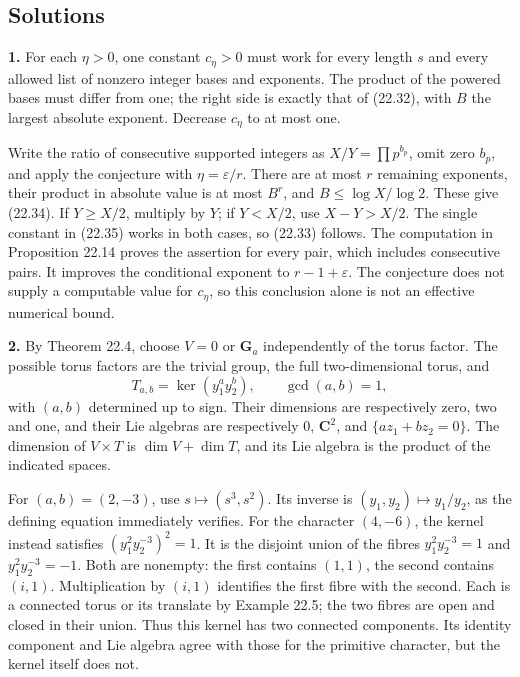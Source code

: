 \documentclass[
  11pt,
  a4paper,
]{article}
\newcounter{none} %
\begin{document}
\subsection{Solutions}\label{solutions}

\textbf{1.} For each \(\eta>0\), one constant \(c_\eta>0\) must work for
every length \(s\) and every allowed list of nonzero integer bases and
exponents. The product of the powered bases must differ from one; the
right side is exactly that of (22.32), with \(B\) the largest absolute
exponent. Decrease \(c_\eta\) to at most one.

Write the ratio of consecutive supported integers as
\(X/Y=\prod p^{b_p}\), omit zero \(b_p\), and apply the conjecture with
\(\eta=\varepsilon/r\). There are at most \(r\) remaining exponents,
their product in absolute value is at most \(B^r\), and
\(B\le\log X/\log2\). These give (22.34). If \(Y\ge X/2\), multiply by
\(Y\); if \(Y<X/2\), use \(X-Y>X/2\). The single constant in (22.35)
works in both cases, so (22.33) follows. The computation in Proposition
22.14 proves the assertion for every pair, which includes consecutive
pairs. It improves the conditional exponent to \(r-1+\varepsilon\). The
conjecture does not supply a computable value for \(c_\eta\), so this
conclusion alone is not an effective numerical bound.

\textbf{2.} By Theorem 22.4, choose \(V=0\) or \(\mathbf G_a\)
independently of the torus factor. The possible torus factors are the
trivial group, the full two-dimensional torus, and \[
 T_{a,b}=\ker(y_1^ay_2^b),\qquad\gcd(a,b)=1,
\] with \((a,b)\) determined up to sign. Their dimensions are
respectively zero, two and one, and their Lie algebras are respectively
\(0\), \(\mathbf C^2\), and \(\{az_1+bz_2=0\}\). The dimension of
\(V\times T\) is \(\dim V+\dim T\), and its Lie algebra is the product
of the indicated spaces.

For \((a,b)=(2,-3)\), use \(s\mapsto(s^3,s^2)\). Its inverse is
\((y_1,y_2)\mapsto y_1/y_2\), as the defining equation immediately
verifies. For the character \((4,-6)\), the kernel instead satisfies
\((y_1^2y_2^{-3})^2=1\). It is the disjoint union of the fibres
\(y_1^2y_2^{-3}=1\) and \(y_1^2y_2^{-3}=-1\). Both are nonempty: the
first contains \((1,1)\), the second contains \((i,1)\). Multiplication
by \((i,1)\) identifies the first fibre with the second. Each is a
connected torus or its translate by Example 22.5; the two fibres are
open and closed in their union. Thus this kernel has two connected
components. Its identity component and Lie algebra agree with those for
the primitive character, but the kernel itself does not.
\end{document}
